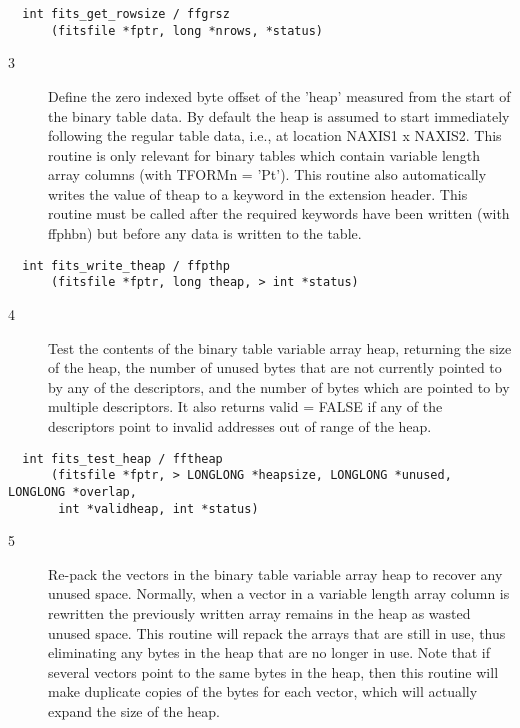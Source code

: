 \documentclass[11pt]{book}
\begin{document}
\begin{verbatim}
  int fits_get_rowsize / ffgrsz
      (fitsfile *fptr, long *nrows, *status)
\end{verbatim}

\begin{description}
\item[3 ] Define the zero indexed byte offset of the 'heap' measured from
    the start of the binary table data.  By default the heap is assumed
    to start immediately following the regular table data, i.e., at
    location NAXIS1 x NAXIS2.  This routine is only relevant for
    binary tables which contain variable length array columns (with
    TFORMn = 'Pt').  This routine also automatically writes
    the value of theap to a keyword in the extension header.  This
    routine must be called after the required keywords have been
    written (with ffphbn)
   but before any data is written to the table. \label{ffpthp}
\end{description}

\begin{verbatim}
  int fits_write_theap / ffpthp
      (fitsfile *fptr, long theap, > int *status)
\end{verbatim}

\begin{description}
\item[4 ] Test the contents of the binary table variable array heap, returning
    the size of the heap, the number of unused bytes that are not currently
    pointed to by any of the descriptors, and the number of bytes which are
    pointed to by multiple descriptors.  It also returns valid = FALSE if
    any of the descriptors point to invalid addresses  out of range of the
    heap. \label{fftheap}
\end{description}

\begin{verbatim}
  int fits_test_heap / fftheap
      (fitsfile *fptr, > LONGLONG *heapsize, LONGLONG *unused, LONGLONG *overlap,
       int *validheap, int *status)
\end{verbatim}

\begin{description}
\item[5 ] Re-pack the vectors in the binary table variable array heap to recover
    any unused space.  Normally, when a vector in a variable length
    array column is rewritten the previously written array remains in
    the heap as wasted unused space.  This routine will repack the
    arrays that are still in use, thus eliminating any bytes in the
    heap that are no longer in use.  Note that if several vectors point
    to the same bytes in the heap, then this routine will make
    duplicate copies of the bytes for each vector, which will actually
   expand the size of the heap. \label{ffcmph}
\end{description}
\end{document}
